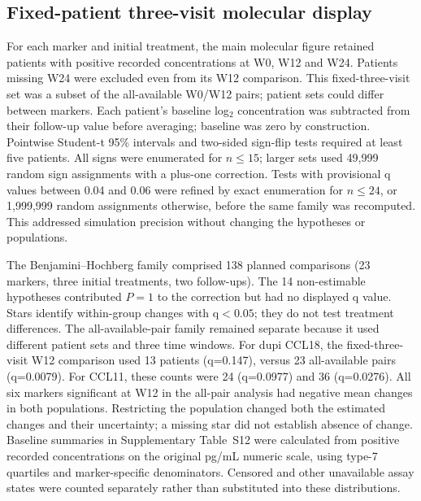 \documentclass[10pt,a4paper]{article}
\begin{document}
\subsection{Fixed-patient three-visit molecular display}
For each marker and initial treatment, the main molecular figure retained patients with positive recorded concentrations at W0, W12 and W24. Patients missing W24 were excluded even from its W12 comparison. This fixed-three-visit set was a subset of the all-available W0/W12 pairs; patient sets could differ between markers. Each patient's baseline log$_2$ concentration was subtracted from their follow-up value before averaging; baseline was zero by construction. Pointwise Student-t 95\% intervals and two-sided sign-flip tests required at least five patients. All signs were enumerated for $n\leq15$; larger sets used 49,999 random sign assignments with a plus-one correction. Tests with provisional q values between 0.04 and 0.06 were refined by exact enumeration for $n\leq24$, or 1,999,999 random assignments otherwise, before the same family was recomputed. This addressed simulation precision without changing the hypotheses or populations.

The Benjamini--Hochberg family comprised 138 planned comparisons (23 markers, three initial treatments, two follow-ups). The 14 non-estimable hypotheses contributed $P=1$ to the correction but had no displayed q value. Stars identify within-group changes with q$<0.05$; they do not test treatment differences. The all-available-pair family remained separate because it used different patient sets and three time windows. For dupi CCL18, the fixed-three-visit W12 comparison used 13 patients (q=0.147), versus 23 all-available pairs (q=0.0079). For CCL11, these counts were 24 (q=0.0977) and 36 (q=0.0276). All six markers significant at W12 in the all-pair analysis had negative mean changes in both populations. Restricting the population changed both the estimated changes and their uncertainty; a missing star did not establish absence of change. Baseline summaries in Supplementary Table~S12 were calculated from positive recorded concentrations on the original pg/mL numeric scale, using type-7 quartiles and marker-specific denominators. Censored and other unavailable assay states were counted separately rather than substituted into these distributions.
\end{document}
